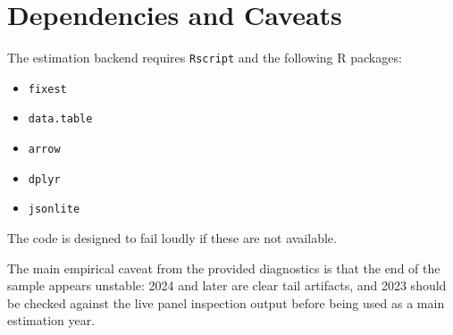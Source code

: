 \documentclass[11pt]{article}
\begin{document}
\section{Dependencies and Caveats}

The estimation backend requires \texttt{Rscript} and the following R packages:

\begin{itemize}[leftmargin=1.5em]
    \item \texttt{fixest}
    \item \texttt{data.table}
    \item \texttt{arrow}
    \item \texttt{dplyr}
    \item \texttt{jsonlite}
\end{itemize}

The code is designed to fail loudly if these are not available.

The main empirical caveat from the provided diagnostics is that the end of the sample appears unstable: 2024 and later are clear tail artifacts, and 2023 should be checked against the live panel inspection output before being used as a main estimation year.
\end{document}
